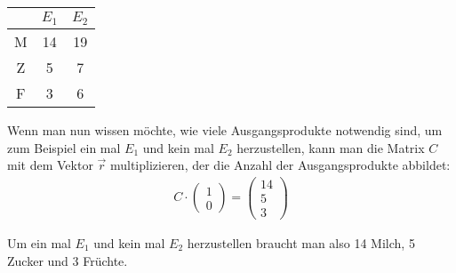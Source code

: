 \begin{center}
\begin{tabular}{c|c|c}
& $E_1$ & $E_2$ \\
\hline
M & 14 & 19 \\
\hline
Z & 5 & 7 \\
\hline
F & 3 & 6
\end{tabular}
\end{center}

\begin{flushleft}
Wenn man nun wissen möchte, wie viele Ausgangsprodukte notwendig sind, um zum Beispiel ein mal $E_1$ und kein mal $E_2$ herzustellen, kann man die Matrix $C$ mit dem Vektor $\vec{r}$ multiplizieren, der die Anzahl der Ausgangsprodukte abbildet:
\begin{align}
    C \cdot \begin{pmatrix} 1 \\ 0 \end{pmatrix}=\begin{pmatrix} 14 \\ 5 \\ 3 \end{pmatrix}
\end{align}

Um ein mal $E_1$ und kein mal $E_2$ herzustellen braucht man also 14 Milch, 5 Zucker und 3 Früchte.
\end{flushleft}

